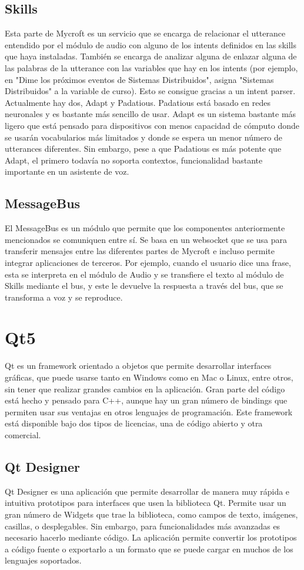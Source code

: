 \subsection{Skills}
Esta parte de Mycroft es un servicio que se encarga de relacionar el utterance entendido por el módulo de audio con alguno de los intents definidos en las skills que haya instaladas. También se encarga de analizar alguna de enlazar alguna de las palabras de la utterance con las variables que hay en los intents (por ejemplo, en "Dime los próximos eventos de Sistemas Distribuidos", asigna "Sistemas Distribuidos" a la variable de curso). Esto se consigue gracias a un intent parser.
Actualmente hay dos, Adapt y Padatious. Padatious está basado en redes neuronales y es bastante más sencillo de usar. Adapt es un sistema bastante más ligero que está pensado para dispositivos con menos capacidad de cómputo donde se usarán vocabularios más limitados y donde se espera un menor número de utterances diferentes. Sin embargo, pese a que Padatious es más potente que Adapt, el primero todavía no soporta contextos, funcionalidad bastante importante en un asistente de voz.
\subsection{MessageBus}
El MessageBus es un módulo que permite que los componentes anteriormente mencionados se comuniquen entre sí. Se basa en un websocket que se usa para transferir mensajes entre las diferentes partes de Mycroft e incluso permite integrar aplicaciones de terceros. Por ejemplo, cuando el usuario dice una frase, esta se interpreta en el módulo de Audio y se transfiere el texto al módulo de Skills mediante el bus, y este le devuelve la respuesta a través del bus, que se transforma a voz y se reproduce.

\section{Qt5}
Qt es un framework orientado a objetos que permite desarrollar interfaces gráficas, que puede usarse tanto en Windows como en Mac o Linux, entre otros, sin tener que realizar grandes cambios en la aplicación. Gran parte del código está hecho y pensado para C++, aunque hay un gran número de bindings que permiten usar sus ventajas en otros lenguajes de programación. Este framework está disponible bajo dos tipos de licencias, una de código abierto y otra comercial.
\subsection{Qt Designer}
Qt Designer es una aplicación que permite desarrollar de manera muy rápida e intuitiva prototipos para interfaces que usen la biblioteca Qt. Permite usar un gran número de Widgets que trae la biblioteca, como campos de texto, imágenes, casillas, o desplegables. Sin embargo, para funcionalidades más avanzadas es necesario hacerlo mediante código. La aplicación permite convertir los prototipos a código fuente o exportarlo a un formato que se puede cargar en muchos de los lenguajes soportados.

